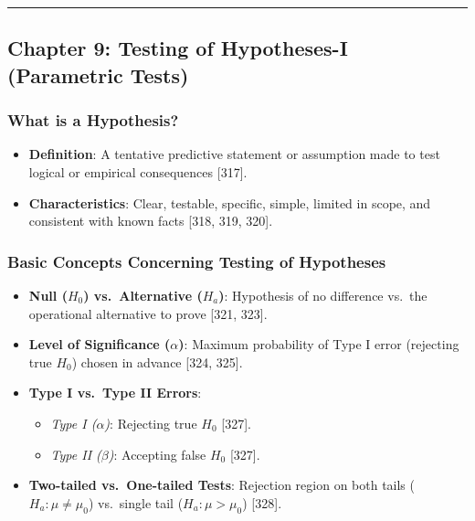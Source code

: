 \documentclass[
]{article}
\providecommand{\tightlist}{%
  \setlength{\itemsep}{0pt}\setlength{\parskip}{0pt}}
\begin{document}
\begin{center}\rule{0.5\linewidth}{0.5pt}\end{center}

\subsection{Chapter 9: Testing of Hypotheses-I (Parametric
Tests)}\label{chapter-9-testing-of-hypotheses-i-parametric-tests}

\subsubsection{What is a Hypothesis?}\label{what-is-a-hypothesis}

\begin{itemize}
\tightlist
\item
  \textbf{Definition}: A tentative predictive statement or assumption
  made to test logical or empirical consequences {[}317{]}.
\item
  \textbf{Characteristics}: Clear, testable, specific, simple, limited
  in scope, and consistent with known facts {[}318, 319, 320{]}.
\end{itemize}

\subsubsection{Basic Concepts Concerning Testing of
Hypotheses}\label{basic-concepts-concerning-testing-of-hypotheses}

\begin{itemize}
\tightlist
\item
  \textbf{Null (\(H_0\)) vs.~Alternative (\(H_a\))}: Hypothesis of no
  difference vs.~the operational alternative to prove {[}321, 323{]}.
\item
  \textbf{Level of Significance (\(\alpha\))}: Maximum probability of
  Type I error (rejecting true \(H_0\)) chosen in advance {[}324,
  325{]}.
\item
  \textbf{Type I vs.~Type II Errors}:

  \begin{itemize}
  \tightlist
  \item
    \emph{Type I (\(\alpha\))}: Rejecting true \(H_0\) {[}327{]}.
  \item
    \emph{Type II (\(\beta\))}: Accepting false \(H_0\) {[}327{]}.
  \end{itemize}
\item
  \textbf{Two-tailed vs.~One-tailed Tests}: Rejection region on both
  tails (\(H_a: \mu \neq \mu_0\)) vs.~single tail (\(H_a: \mu > \mu_0\))
  {[}328{]}.
\end{itemize}
\end{document}
